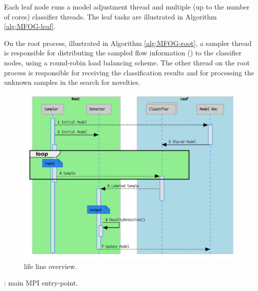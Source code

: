Each leaf node runs a model adjustment thread and multiple (up to the number of
cores) classifier threads. The leaf tasks are illustrated in Algorithm
\ref{alg:MFOG-leaf}.

On the root process, illustrated in Algorithm \ref{alg:MFOG-root}, a sampler
thread is responsible for distributing the
sampled flow information (\val) to the classifier nodes, using a round-robin
load balancing scheme.
The other thread on the root process is responsible for receiving the
classification results and for processing the unknown samples in the search for
novelties.

\begin{figure}[h]
    \centering
    \includegraphics[width=0.7\linewidth,page=1]{lifecycle_uml_svg.pdf}
    \caption{\mfog life line overview.}
    \label{fig:mfog-mpi-life}
\end{figure}

\setlength{\intextsep}{5pt}

\begin{algorithm}[h]
    
    \KwParams{\mpiRank}
\caption{\mfog: main MPI entry-point.}
\label{alg:MFOG}
\end{algorithm}

